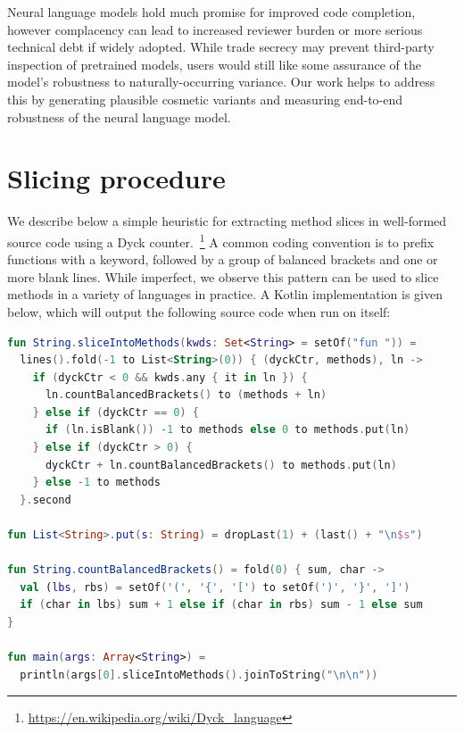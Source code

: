 \documentclass[sigconf,review,anonymous]{acmart}
\begin{document}
  Neural language models hold much promise for improved code completion, however complacency can lead to increased reviewer burden or more serious technical debt if widely adopted. While trade secrecy may prevent third-party inspection of pretrained models, users would still like some assurance of the model's robustness to naturally-occurring variance. Our work helps to address this by generating plausible cosmetic variants and measuring end-to-end robustness of the neural language model.
  \pagebreak
  
  \pagebreak
  \appendix

  \section{Slicing procedure}\label{sec:slicing}

  We describe below a simple heuristic for extracting method slices in well-formed source code using a Dyck counter.~\footnote{\url{https://en.wikipedia.org/wiki/Dyck\_language}} A common coding convention is to prefix functions with a keyword, followed by a group of balanced brackets and one or more blank lines. While imperfect, we observe this pattern can be used to slice methods in a variety of languages in practice. A Kotlin implementation is given below, which will output the following source code when run on itself:

  \vspace{11pt}

  \begin{lstlisting}[basicstyle=\scriptsize\ttfamily, language=kotlin,label={lst:example4}]
fun String.sliceIntoMethods(kwds: Set<String> = setOf("fun ")) =
  lines().fold(-1 to List<String>(0)) { (dyckCtr, methods), ln ->
    if (dyckCtr < 0 && kwds.any { it in ln }) {
      ln.countBalancedBrackets() to (methods + ln)
    } else if (dyckCtr == 0) {
      if (ln.isBlank()) -1 to methods else 0 to methods.put(ln)
    } else if (dyckCtr > 0) {
      dyckCtr + ln.countBalancedBrackets() to methods.put(ln)
    } else -1 to methods
  }.second

fun List<String>.put(s: String) = dropLast(1) + (last() + "\n$s")

fun String.countBalancedBrackets() = fold(0) { sum, char ->
  val (lbs, rbs) = setOf('(', '{', '[') to setOf(')', '}', ']')
  if (char in lbs) sum + 1 else if (char in rbs) sum - 1 else sum
}

fun main(args: Array<String>) =
  println(args[0].sliceIntoMethods().joinToString("\n\n"))
  \end{lstlisting}
\end{document}
